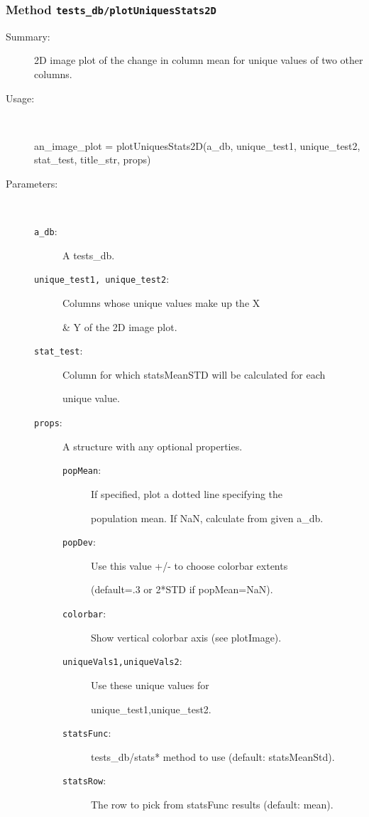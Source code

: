 \subsubsection[Method \texttt{plotUniquesStats2D}]{Method \texttt{tests\_db/plotUniquesStats2D}}%
%
\label{ref_tests_db__plotUniquesStats2D}%
\hypertarget{ref_tests_db__plotUniquesStats2D}{}%
\begin{description}
\item[Summary:]2D image plot of the change in column mean for unique values of two other columns.
%
\item[Usage:]~%
\begin{lyxcode}%
an\_image\_plot = plotUniquesStats2D(a\_db, unique\_test1, unique\_test2, 
 					stat\_test, title\_str, props)
%
\end{lyxcode}%
%
%
\item[Parameters:]~
\begin{description}%
\item[\texttt{a\_db}:]
 A tests\_db.
\item[\texttt{unique\_test1, unique\_test2}:]
 Columns whose unique values make up the X

\& Y of the 2D image plot.
\item[\texttt{stat\_test}:]
 Column for which statsMeanSTD will be calculated for each

unique value.
\item[\texttt{props}:]
 A structure with any optional properties.
\begin{description}%
\item[\texttt{popMean}:]
 If specified, plot a dotted line specifying the

population mean. If NaN, calculate from given a\_db.
\item[\texttt{popDev}:]
 Use this value +/- to choose colorbar extents

(default=.3 or 2*STD if popMean=NaN).
\item[\texttt{colorbar}:]
 Show vertical colorbar axis (see plotImage).
\item[\texttt{uniqueVals1,uniqueVals2}:]
 Use these unique values for

unique\_test1,unique\_test2.
\item[\texttt{statsFunc}:]
 tests\_db/stats* method to use (default: statsMeanStd).
\item[\texttt{statsRow}:]
 The row to pick from statsFunc results (default: mean).


\end{description}
\end{description}
\end{description}
